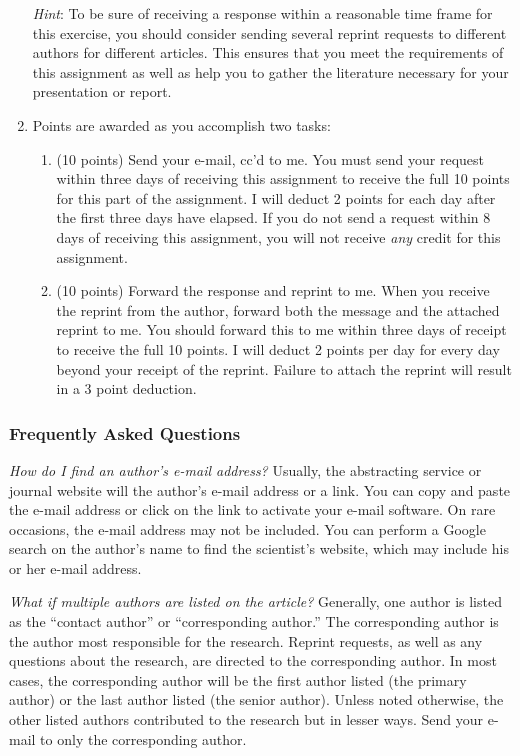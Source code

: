 \documentclass[12pt]{article}
\begin{document}
\begin{enumerate}[leftmargin=*]
\emph{Hint}: To be sure of receiving a response within a reasonable time
frame for this exercise, you should consider sending several reprint
requests to different authors for different articles. This ensures that you 
meet the requirements of this assignment as well as help you to gather
the literature necessary for your presentation or report.

\item Points are awarded as you accomplish two tasks:

\begin{enumerate}[leftmargin=\parindent]
\item (10 points) Send your e-mail, cc'd to me. You must send your
request within three days of receiving this assignment to receive the
full 10 points for this part of the assignment. I will deduct 2 points for
each day after the first three days have elapsed. If you do not send a
request within 8 days of receiving this assignment, you will not receive
\emph{any} credit for this assignment.

\item (10 points) Forward the response and reprint to me. When you
receive the reprint from the author, forward both the message and the
attached reprint to me. You should forward this to me within three days
of receipt to receive the full 10 points. I will deduct 2 points per day
for every day beyond your receipt of the reprint. Failure to attach the
reprint will result in a 3 point deduction.
\end{enumerate}
\end{enumerate}

\subsubsection*{Frequently Asked Questions}

\emph{How do I find an author's e-mail address?} Usually, the
abstracting service or journal website will the
author's e-mail address or a link. You can copy and paste the e-mail address or
click on the link to activate your e-mail software. On rare occasions,
the e-mail address may not be included. You can perform a Google search
on the author's name to find the scientist's website, which may include
his or her e-mail address.\vspace*{\baselineskip}

\emph{What if multiple authors are listed on the article?} Generally,
one author is listed as the ``contact author'' or ``corresponding
author.'' The corresponding author is the author most responsible for
the research. Reprint requests, as well as any questions about the
research, are directed to the corresponding author. In most cases, the
corresponding author will be the first author listed (the primary
author) or the last author listed (the senior author). Unless noted
otherwise, the other listed authors contributed to the research but in
lesser ways. Send your e-mail to only the corresponding author.\vspace*{\baselineskip}
\end{document}
